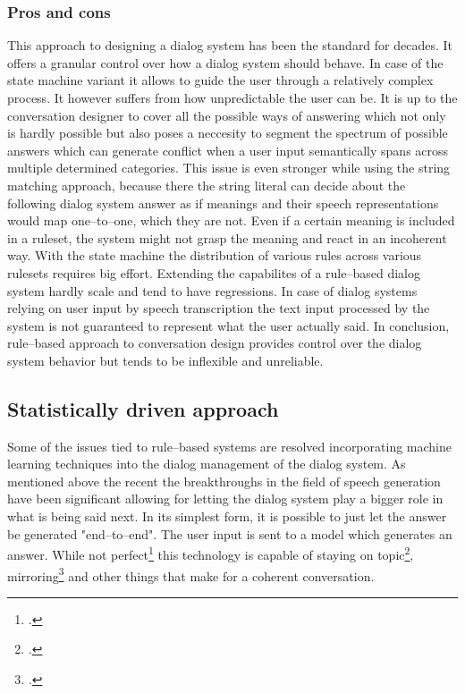 \documentclass[12pt]{report}
\begin{document}
{\subsubsection{Pros and cons}

\par
This approach to designing a dialog system
has been the standard for decades.
It offers a granular control over how a dialog system should behave.
In case of the state machine variant it
allows to guide the user through a relatively complex process.
It however suffers from how unpredictable the user can be.
It is up to the conversation designer to cover all the possible ways of answering
which not only is hardly possible
but also poses a neccesity to segment the spectrum of possible answers
which can generate conflict when
a user input semantically spans across multiple determined categories.
This issue is even stronger while using the string matching approach,
because there the string literal can decide about the following dialog system answer
as if meanings and their speech representations would map one–to–one,
which they are not.
Even if a certain meaning is included in a ruleset,
the system might not grasp the meaning and react in an incoherent way.
With the state machine the
distribution of various rules across various rulesets
requires big effort.
Extending the capabilites of a rule–based dialog system
hardly scale and tend to have regressions.
In case of dialog systems relying on user input by speech transcription
the text input processed by the system is not guaranteed to represent
what the user actually said.
In conclusion, rule–based approach to conversation design
provides control over the dialog system behavior
but tends to be inflexible and unreliable.

\subsection{Statistically driven approach}

Some of the issues tied to rule–based systems
are resolved incorporating machine learning techniques into the dialog management of the dialog system.
As mentioned above the recent the breakthroughs in the field
of speech generation have been significant
allowing for letting the dialog system play a bigger role
in what is being said next.
In its simplest form,
it is possible to just let the answer be generated "end–to–end".
The user input is sent to a model which generates an answer.
While not perfect\footcite{tie2024llms}
this technology is capable of staying on topic\footcite{sreedhar2024canttalkaboutthisaligninglanguagemodels},
mirroring\footcite{ivey2024real}
and other things that make for a coherent conversation.

}
\end{document}
